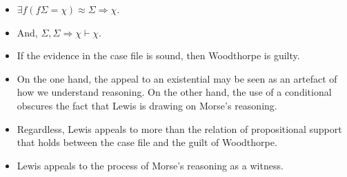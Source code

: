 \documentclass[10pt]{article}
\begin{document}
\begin{itemize}
\begin{itemize}
\begin{itemize}
    \end{itemize}
  \end{itemize}
\item \(\exists f(f\Sigma = \chi) \approx \Sigma \Rightarrow \chi\).
\item And, \(\Sigma, \Sigma \Rightarrow \chi \vdash \chi\).
\item If the evidence in the case file is sound, then Woodthorpe is guilty.
\item On the one hand, the appeal to an existential may be seen as an artefact of how we understand reasoning.
  On the other hand, the use of a conditional obscures the fact that Lewis is drawing on Morse's reasoning.
\item Regardless, Lewis appeals to more than the relation of propositional support that holds between the case file and the guilt of Woodthorpe.
\item Lewis appeals to the process of Morse's reasoning as a witness.
\end{itemize}
\end{document}
